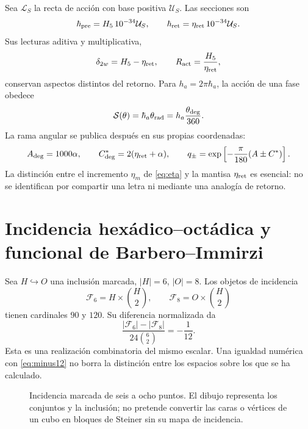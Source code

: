\documentclass[11pt,a4paper]{article}
\numberwithin{equation}{section}
\theoremstyle{definition}
\begin{document}
Sea $\mathcal L_S$ la recta de acción con base positiva $\mathcal U_S$.
Las secciones son
\begin{equation}
\hbar_{\rm pre}=H_5\,10^{-34}\mathcal U_S,\qquad
\hbar_{\rm ret}=\eta_{\rm ret}\,10^{-34}\mathcal U_S.
\end{equation}
Sus lecturas aditiva y multiplicativa,
\[
\delta_{2w}=H_5-\eta_{\rm ret},\qquad
R_{\rm act}=\frac{H_5}{\eta_{\rm ret}},
\]
conservan aspectos distintos del retorno. Para $h_a=2\pi\hbar_a$,
la acción de una fase obedece
\[
\mathcal S(\theta)=\hbar_a\theta_{\rm rad}
=h_a\frac{\theta_{\deg}}{360}.
\]
La rama angular se publica después en sus propias coordenadas:
\[
A_{\deg}=1000\alpha,\qquad
C^*_{\deg}=2(\eta_{\rm ret}+\alpha),\qquad
q_\pm=\exp\left[-\frac{\pi}{180}(A\pm C^*)\right].
\]
La distinción entre el incremento $\eta_m$ de \eqref{eq:eta}
y la mantisa $\eta_{\rm ret}$ es esencial: no se identifican
por compartir una letra ni mediante una analogía de retorno.

\section{Incidencia hexádico--octádica y funcional de Barbero--Immirzi}
\label{sec:barbero}
Sea $H\hookrightarrow O$ una inclusión marcada, $|H|=6$, $|O|=8$.
Los objetos de incidencia
\[
\mathcal F_6=H\times\binom H2,\qquad
\mathcal F_8=O\times\binom H2
\]
tienen cardinales $90$ y $120$. Su diferencia normalizada da
\[
\frac{|\mathcal F_6|-|\mathcal F_8|}{24\binom62}=-\frac1{12}.
\]
Esta es una realización combinatoria del mismo escalar.
Una igualdad numérica con \eqref{eq:minus12} no borra
la distinción entre los espacios sobre los que se ha calculado.

\begin{figure}[htbp]
\centering
{}
\caption{Incidencia marcada de seis a ocho puntos. El dibujo representa
los conjuntos y la inclusión; no pretende convertir las caras o vértices
de un cubo en bloques de Steiner sin su mapa de incidencia.}
\end{figure}
\end{document}
